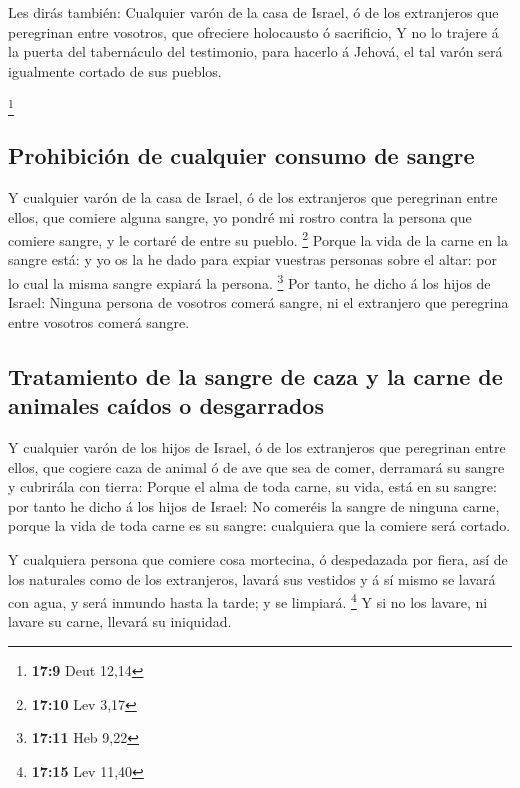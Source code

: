  Les dirás también: Cualquier varón de la casa de Israel,
ó de los extranjeros que peregrinan entre vosotros, que ofreciere
holocausto ó sacrificio,  Y no lo trajere á la puerta del
tabernáculo del testimonio, para hacerlo á Jehová, el tal varón será
igualmente cortado de sus pueblos.

\footnote{\textbf{17:9} Deut 12,14}

\hypertarget{prohibiciuxf3n-de-cualquier-consumo-de-sangre}{%
\subsection{Prohibición de cualquier consumo de
sangre}\label{prohibiciuxf3n-de-cualquier-consumo-de-sangre}}

 Y cualquier varón de la casa de Israel, ó de los
extranjeros que peregrinan entre ellos, que comiere alguna sangre, yo
pondré mi rostro contra la persona que comiere sangre, y le cortaré de
entre su pueblo. \footnote{\textbf{17:10} Lev 3,17} 
Porque la vida de la carne en la sangre está: y yo os la he dado para
expiar vuestras personas sobre el altar: por lo cual la misma sangre
expiará la persona. \footnote{\textbf{17:11} Heb 9,22} 
Por tanto, he dicho á los hijos de Israel: Ninguna persona de vosotros
comerá sangre, ni el extranjero que peregrina entre vosotros comerá
sangre.

\hypertarget{tratamiento-de-la-sangre-de-caza-y-la-carne-de-animales-cauxeddos-o-desgarrados}{%
\subsection{Tratamiento de la sangre de caza y la carne de animales
caídos o
desgarrados}\label{tratamiento-de-la-sangre-de-caza-y-la-carne-de-animales-cauxeddos-o-desgarrados}}

 Y cualquier varón de los hijos de Israel, ó de los
extranjeros que peregrinan entre ellos, que cogiere caza de animal ó de
ave que sea de comer, derramará su sangre y cubrirála con tierra:
 Porque el alma de toda carne, su vida, está en su
sangre: por tanto he dicho á los hijos de Israel: No comeréis la sangre
de ninguna carne, porque la vida de toda carne es su sangre: cualquiera
que la comiere será cortado.

 Y cualquiera persona que comiere cosa mortecina, ó
despedazada por fiera, así de los naturales como de los extranjeros,
lavará sus vestidos y á sí mismo se lavará con agua, y será inmundo
hasta la tarde; y se limpiará. \footnote{\textbf{17:15} Lev 11,40}
 Y si no los lavare, ni lavare su carne, llevará su
iniquidad.

